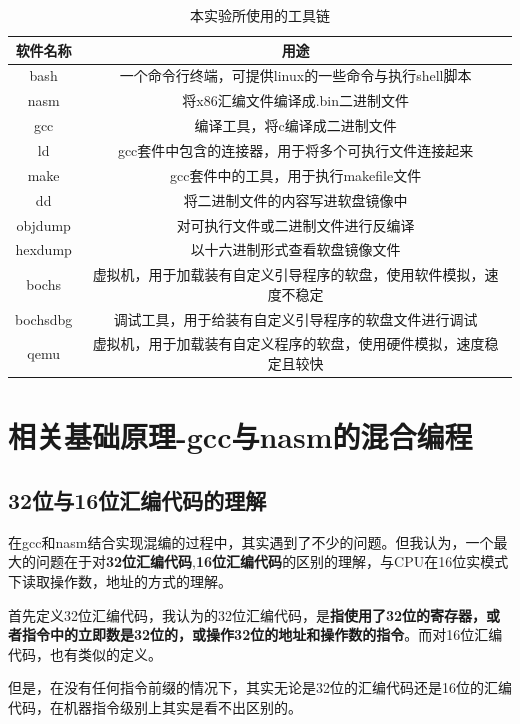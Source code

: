 \documentclass[forprint]{WHUBachelor}
\begin{document}
\begin{table}[htp]
  \caption{本实验所使用的工具链}
  \centering
  \begin{tabular}{cc}
    \toprule
    软件名称 & 用途  \\
    \midrule
    bash & 一个命令行终端，可提供linux的一些命令与执行shell脚本 \\
    nasm & 将x86汇编文件编译成.bin二进制文件 \\
    gcc & 编译工具，将c编译成二进制文件 \\
    ld & gcc套件中包含的连接器，用于将多个可执行文件连接起来 \\
    make & gcc套件中的工具，用于执行makefile文件 \\
    dd & 将二进制文件的内容写进软盘镜像中  \\
    objdump & 对可执行文件或二进制文件进行反编译 \\
    hexdump & 以十六进制形式查看软盘镜像文件 \\
    bochs & 虚拟机，用于加载装有自定义引导程序的软盘，使用软件模拟，速度不稳定  \\
    bochsdbg & 调试工具，用于给装有自定义引导程序的软盘文件进行调试 \\
    qemu & 虚拟机，用于加载装有自定义程序的软盘，使用硬件模拟，速度稳定且较快 \\
    \bottomrule
  \end{tabular}
  \label{tab:tools}
\end{table}

\section{相关基础原理-gcc与nasm的混合编程}

\subsection{32位与16位汇编代码的理解}

在gcc和nasm结合实现混编的过程中，其实遇到了不少的问题。但我认为，一个最大的问题在于对\textbf{32位汇编代码},\textbf{16位汇编代码}的区别的理解，与CPU在16位实模式下读取操作数，地址的方式的理解。

首先定义32位汇编代码，我认为的32位汇编代码，是\textbf{指使用了32位的寄存器，或者指令中的立即数是32位的，或操作32位的地址和操作数的指令}。而对16位汇编代码，也有类似的定义。

但是，在没有任何指令前缀的情况下，其实无论是32位的汇编代码还是16位的汇编代码，在机器指令级别上其实是看不出区别的。
\end{document}
